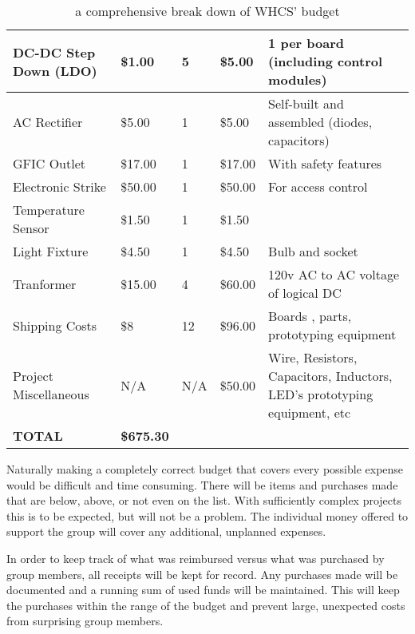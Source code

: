 \begin{table}[H]
{\begin{tabular}{|b{4.5cm}|l|l|l|b{4cm}|}
{\color{black} DC{}-DC Step Down (LDO)} &
{\color{black} \$1.00} &
{\color{black} 5} &
{\color{black} \$5.00} &
{\color{black} 1 per board (including control modules)}\\\hline
{\color{black} AC Rectifier} &
{\color{black} \$5.00} &
{\color{black} 1} &
{\color{black} \$5.00} &
{\color{black} Self{}-built and assembled (diodes, capacitors)}\\\hline
{\color{black} GFIC Outlet} &
{\color{black} \$17.00} &
{\color{black} 1} &
{\color{black} \$17.00} &
{\color{black} With safety features}\\\hline
{\color{black} Electronic Strike} &
{\color{black} \$50.00} &
{\color{black} 1} &
{\color{black} \$50.00} &
{\color{black} For access control}\\\hline
{\color{black} Temperature Sensor} &
{\color{black} \$1.50} &
{\color{black} 1} &
{\color{black} \$1.50} &
\\\hline
{\color{black} Light Fixture} &
{\color{black} \$4.50} &
{\color{black} 1} &
{\color{black} \$4.50} &
{\color{black} Bulb and socket}\\\hline
{\color{black} Tranformer} &
{\color{black} \$15.00} &
{\color{black} 4} &
{\color{black} \$60.00} &
{\color{black} 120v AC to AC voltage of logical DC}\\\hline
{\color{black} Shipping Costs} &
{\color{black} \$8} &
{\color{black} 12} &
{\color{black} \$96.00} &
{\color{black} Boards , parts, prototyping equipment}\\\hline
{\color{black} Project Miscellaneous} &
{\color{black} N/A} &
{\color{black} N/A} &
{\color{black} \$50.00} &
{\color{black} Wire, Resistors, Capacitors, Inductors, LED{}'s prototyping equipment, etc}\\\hline
{\color{black} \textbf{TOTAL}} &
{\color{black} \textbf{\$675.30}} &
 &
 &
\\\hline
\end{tabular}
}
\caption{a comprehensive break down of WHCS' budget}
\label{tab:budget}
\end{table}

Naturally making a completely correct budget that covers every possible expense
would be difficult and time consuming. There will be items and purchases made
that are below, above, or not even on the list. With sufficiently complex
projects this is to be expected, but will not be a problem. The individual
money offered to support the group will cover any additional, unplanned
expenses.

In order to keep track of what was reimbursed versus what was purchased by
group members, all receipts will be kept for record. Any purchases made will be
documented and a running sum of used funds will be maintained. This will keep
the purchases within the range of the budget and prevent large, unexpected
costs from surprising group members.

